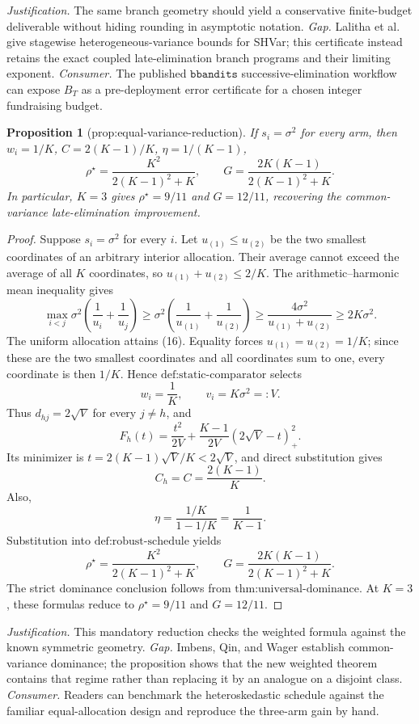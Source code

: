 \documentclass{article}
\newtheorem{proposition}{Proposition}
\begin{document}
\par\smallskip\noindent \textit{Justification.} The same branch geometry should yield a conservative finite-budget deliverable without hiding rounding in asymptotic notation. \textit{Gap.} Lalitha et al. give stagewise heterogeneous-variance bounds for SHVar; this certificate instead retains the exact coupled late-elimination branch programs and their limiting exponent. \textit{Consumer.} The published \(\texttt{bbandits}\) successive-elimination workflow can expose \(B_T\) as a pre-deployment error certificate for a chosen integer fundraising budget.

\begin{proposition}[prop:equal-variance-reduction]\label{prop:equal-variance-reduction}
If \(s_i=\sigma^2\) for every arm, then \(w_i=1/K\), \(C=2(K-1)/K\), \(\eta=1/(K-1)\), \[\rho^\star=\frac{K^2}{2(K-1)^2+K},\qquad G=\frac{2K(K-1)}{2(K-1)^2+K}.\] In particular, \(K=3\) gives \(\rho^\star=9/11\) and \(G=12/11\), recovering the common-variance late-elimination improvement.
\end{proposition}
\begin{proof}
Suppose \(s_i=\sigma^2\) for every \(i\). Let \(u_{(1)}\leq u_{(2)}\) be the two smallest coordinates of an arbitrary interior allocation. Their average cannot exceed the average of all \(K\) coordinates, so \(u_{(1)}+u_{(2)}\leq2/K\). The arithmetic--harmonic mean inequality gives
\[
 \max_{i<j}\sigma^2\left(\frac1{u_i}+\frac1{u_j}\right)
 \geq \sigma^2\left(\frac1{u_{(1)}}+\frac1{u_{(2)}}\right)
 \geq \frac{4\sigma^2}{u_{(1)}+u_{(2)}}
 \geq2K\sigma^2. \tag{16}
\]
The uniform allocation attains (16). Equality forces \(u_{(1)}=u_{(2)}=1/K\); since these are the two smallest coordinates and all coordinates sum to one, every coordinate is then \(1/K\). Hence \(\text{def:static-comparator}\) selects
\[
 w_i=\frac1K,\qquad v_i=K\sigma^2=:V.
\]
Thus \(d_{hj}=2\sqrt V\) for every \(j\ne h\), and
\[
 F_h(t)=\frac{t^2}{2V}
 +\frac{K-1}{2V}(2\sqrt V-t)_+^2.
\]
Its minimizer is \(t=2(K-1)\sqrt V/K<2\sqrt V\), and direct substitution gives
\[
 C_h=C=\frac{2(K-1)}K.
\]
Also,
\[
 \eta=\frac{1/K}{1-1/K}=\frac1{K-1}.
\]
Substitution into \(\text{def:robust-schedule}\) yields
\[
 \rho^\star
 =\frac{K^2}{2(K-1)^2+K},
 \qquad
 G=\frac{2K(K-1)}{2(K-1)^2+K}.
\]
The strict dominance conclusion follows from \(\text{thm:universal-dominance}\). At \(K=3\), these formulas reduce to \(\rho^\star=9/11\) and \(G=12/11\).
\end{proof}
\par\smallskip\noindent \textit{Justification.} This mandatory reduction checks the weighted formula against the known symmetric geometry. \textit{Gap.} Imbens, Qin, and Wager establish common-variance dominance; the proposition shows that the new weighted theorem contains that regime rather than replacing it by an analogue on a disjoint class. \textit{Consumer.} Readers can benchmark the heteroskedastic schedule against the familiar equal-allocation design and reproduce the three-arm gain by hand.
\end{document}
